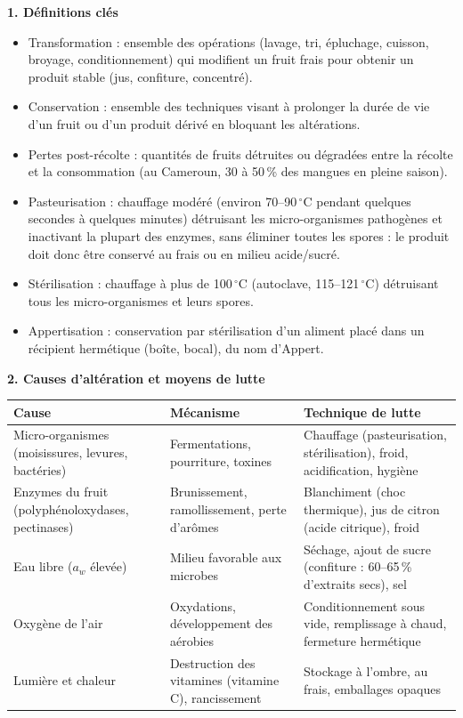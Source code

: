 \documentclass[11pt]{article}
\newcommand{\cle}[1]{{\popxbold\color{popdark}#1}}
\begin{document}
\begin{aretenir}
\textbf{1. Définitions clés}
\begin{itemize}
  \item \cle{Transformation} : ensemble des opérations (lavage, tri, épluchage, cuisson, broyage, conditionnement) qui modifient un fruit frais pour obtenir un produit stable (jus, confiture, concentré).
  \item \cle{Conservation} : ensemble des techniques visant à prolonger la durée de vie d'un fruit ou d'un produit dérivé en bloquant les altérations.
  \item \cle{Pertes post-récolte} : quantités de fruits détruites ou dégradées entre la récolte et la consommation (au Cameroun, 30 à 50\,\% des mangues en pleine saison).
  \item \cle{Pasteurisation} : chauffage modéré (environ 70--90\,$^\circ$C pendant quelques secondes à quelques minutes) détruisant les micro-organismes pathogènes et inactivant la plupart des enzymes, sans éliminer toutes les spores : le produit doit donc être conservé au frais ou en milieu acide/sucré.
  \item \cle{Stérilisation} : chauffage à plus de 100\,$^\circ$C (autoclave, 115--121\,$^\circ$C) détruisant tous les micro-organismes et leurs spores.
  \item \cle{Appertisation} : conservation par stérilisation d'un aliment placé dans un récipient hermétique (boîte, bocal), du nom d'Appert.
\end{itemize}

\textbf{2. Causes d'altération et moyens de lutte}
\begin{center}
\begin{tabularx}{\linewidth}{|l|X|X|}
\hline
\rowcolor{popblueL} \textbf{Cause} & \textbf{Mécanisme} & \textbf{Technique de lutte} \\
\hline
Micro-organismes (moisissures, levures, bactéries) & Fermentations, pourriture, toxines & Chauffage (pasteurisation, stérilisation), froid, acidification, hygiène \\
\hline
Enzymes du fruit (polyphénoloxydases, pectinases) & Brunissement, ramollissement, perte d'arômes & Blanchiment (choc thermique), jus de citron (acide citrique), froid \\
\hline
Eau libre ($a_w$ élevée) & Milieu favorable aux microbes & Séchage, ajout de sucre (confiture : 60--65\,\% d'extraits secs), sel \\
\hline
Oxygène de l'air & Oxydations, développement des aérobies & Conditionnement sous vide, remplissage à chaud, fermeture hermétique \\
\hline
Lumière et chaleur & Destruction des vitamines (vitamine C), rancissement & Stockage à l'ombre, au frais, emballages opaques \\
\hline
\end{tabularx}
\end{center}


\end{aretenir}
\end{document}
